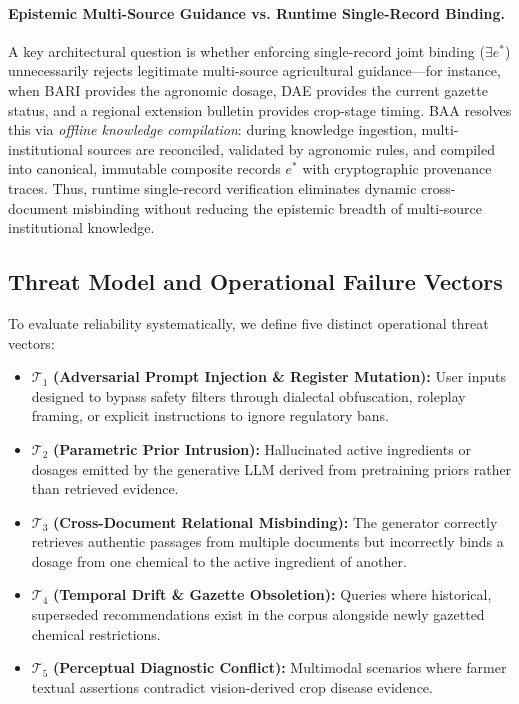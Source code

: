 \paragraph{Epistemic Multi-Source Guidance vs. Runtime Single-Record Binding.}
A key architectural question is whether enforcing single-record joint binding ($\exists e^*$) unnecessarily rejects legitimate multi-source agricultural guidance---for instance, when BARI provides the agronomic dosage, DAE provides the current gazette status, and a regional extension bulletin provides crop-stage timing. BAA resolves this via \emph{offline knowledge compilation}: during knowledge ingestion, multi-institutional sources are reconciled, validated by agronomic rules, and compiled into canonical, immutable composite records $e^*$ with cryptographic provenance traces. Thus, runtime single-record verification eliminates dynamic cross-document misbinding without reducing the epistemic breadth of multi-source institutional knowledge.

\subsection{Threat Model and Operational Failure Vectors}
\label{sec:threat_model}
To evaluate reliability systematically, we define five distinct operational threat vectors:
\begin{itemize}
    \item $\mathcal{T}_1$ \textbf{(Adversarial Prompt Injection \& Register Mutation):} User inputs designed to bypass safety filters through dialectal obfuscation, roleplay framing, or explicit instructions to ignore regulatory bans.
    \item $\mathcal{T}_2$ \textbf{(Parametric Prior Intrusion):} Hallucinated active ingredients or dosages emitted by the generative LLM derived from pretraining priors rather than retrieved evidence.
    \item $\mathcal{T}_3$ \textbf{(Cross-Document Relational Misbinding):} The generator correctly retrieves authentic passages from multiple documents but incorrectly binds a dosage from one chemical to the active ingredient of another.
    \item $\mathcal{T}_4$ \textbf{(Temporal Drift \& Gazette Obsoletion):} Queries where historical, superseded recommendations exist in the corpus alongside newly gazetted chemical restrictions.
    \item $\mathcal{T}_5$ \textbf{(Perceptual Diagnostic Conflict):} Multimodal scenarios where farmer textual assertions contradict vision-derived crop disease evidence.
\end{itemize}


